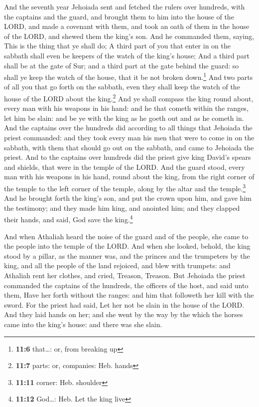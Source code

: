  And the seventh year Jehoiada sent and fetched the rulers
over hundreds, with the captains and the guard, and brought them to him
into the house of the LORD, and made a covenant with them, and took an
oath of them in the house of the LORD, and shewed them the king's son.
 And he commanded them, saying, This is the thing that ye
shall do; A third part of you that enter in on the sabbath shall even be
keepers of the watch of the king's house;  And a third
part shall be at the gate of Sur; and a third part at the gate behind
the guard: so shall ye keep the watch of the house, that it be not
broken down.\footnote{\textbf{11:6} that\ldots: or, from breaking up}
 And two parts of all you that go forth on the sabbath,
even they shall keep the watch of the house of the LORD about the
king.\footnote{\textbf{11:7} parts: or, companies: Heb. hands}
 And ye shall compass the king round about, every man with
his weapons in his hand: and he that cometh within the ranges, let him
be slain: and be ye with the king as he goeth out and as he cometh in.
 And the captains over the hundreds did according to all
things that Jehoiada the priest commanded: and they took every man his
men that were to come in on the sabbath, with them that should go out on
the sabbath, and came to Jehoiada the priest.  And to the
captains over hundreds did the priest give king David's spears and
shields, that were in the temple of the LORD.  And the
guard stood, every man with his weapons in his hand, round about the
king, from the right corner of the temple to the left corner of the
temple, along by the altar and the temple.\footnote{\textbf{11:11}
  corner: Heb. shoulder}  And he brought forth the king's
son, and put the crown upon him, and gave him the testimony; and they
made him king, and anointed him; and they clapped their hands, and said,
God save the king.\footnote{\textbf{11:12} God\ldots: Heb. Let the king
  live}

 And when Athaliah heard the noise of the guard and of
the people, she came to the people into the temple of the LORD.
 And when she looked, behold, the king stood by a pillar,
as the manner was, and the princes and the trumpeters by the king, and
all the people of the land rejoiced, and blew with trumpets: and
Athaliah rent her clothes, and cried, Treason, Treason. 
But Jehoiada the priest commanded the captains of the hundreds, the
officers of the host, and said unto them, Have her forth without the
ranges: and him that followeth her kill with the sword. For the priest
had said, Let her not be slain in the house of the LORD. 
And they laid hands on her; and she went by the way by the which the
horses came into the king's house: and there was she slain.

